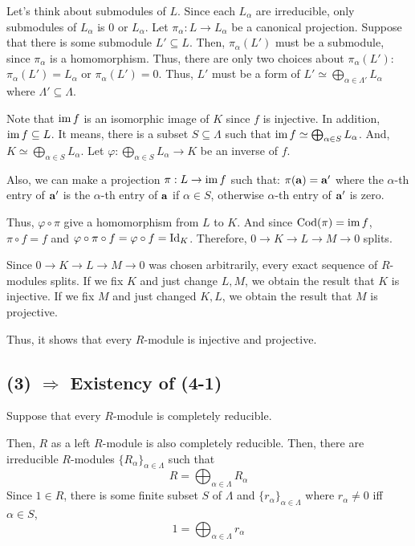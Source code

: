 Let's think about submodules of \(L\).
Since each \(L_\alpha\) are irreducible,
only submodules of \(L_\alpha\) is \(0\) or \(L_\alpha\).
Let \(\pi_\alpha: L \to L_\alpha\) be a canonical projection.
Suppose that there is some submodule \(L' \subseteq L\).
Then, \(\pi_\alpha(L')\) must be a submodule,
since \(\pi_\alpha\) is a homomorphism.
Thus, there are only two choices about \(\pi_\alpha(L')\):
\(\pi_\alpha(L') = L_\alpha\)
or \(\pi_\alpha(L') = 0\).
Thus, \(L'\) must be a form of
\(L' \simeq \bigoplus_{\alpha \in \Lambda'} L_\alpha\)
where \(\Lambda' \subseteq \Lambda\).

Note that \(\textnormal{im}\, f\) is an isomorphic image of \(K\) since \(f\) is injective.
In addition, \(\textnormal{im}\, f \subseteq L\).
It means, there is a subset \(S \subseteq \Lambda\)
such that \(\textnormal{im}\, f \simeq \bigoplus_{\alpha \in S} L_\alpha\).
And, \(K \simeq \bigoplus_{\alpha \in S} L_\alpha\).
Let \(\varphi: \bigoplus_{\alpha \in S} L_\alpha \to K\) be an inverse of \(f\).

Also, we can make a projection \(\pi: L \to \textnormal{im}\, f\) such that:
\(\pi(\mathbf{a}) = \mathbf{a}'\)
where the \(\alpha\)-th entry of \(\mathbf{a}'\) is
the \(\alpha\)-th entry of \(\mathbf{a}\) if \(\alpha \in S\),
otherwise \(\alpha\)-th entry of \(\mathbf{a}'\) is zero.

Thus, \(\varphi \circ \pi\) give a homomorphism from \(L\) to \(K\).
And since \(\textnormal{Cod}(\pi) = \textnormal{im}\, f\), \(\pi \circ f = f\) and
\(\varphi \circ \pi \circ f = \varphi \circ f = \textnormal{Id}_K\).
Therefore, \(0 \to K \to L \to M \to 0\) splits.

Since \(0 \to K \to L \to M \to 0\) was chosen arbitrarily,
every exact sequence of \(R\)-modules splits.
If we fix \(K\) and just change \(L, M\),
we obtain the result that \(K\) is injective.
If we fix \(M\) and just changed \(K, L\),
we obtain the result that \(M\) is projective.

Thus, it shows that every \(R\)-module is injective and projective.
\qedsq

\subsection*{(3) \(\Rightarrow\) Existency of (4-1)}

Suppose that every \(R\)-module is completely reducible.

Then, \(R\) as a left \(R\)-module is also completely reducible.
Then, there are irreducible \(R\)-modules \(\{R_\alpha\}_{\alpha \in \Lambda}\)
such that
\[R = \bigoplus_{\alpha \in \Lambda} R_\alpha\]
Since \(1 \in R\), there is some finite subset \(S\) of \(\Lambda\)
and \(\{r_\alpha\}_{\alpha \in \Lambda}\)
where \(r_\alpha \neq 0\) iff \(\alpha \in S\),
\[1 = \bigoplus_{\alpha \in \Lambda} r_\alpha\]

